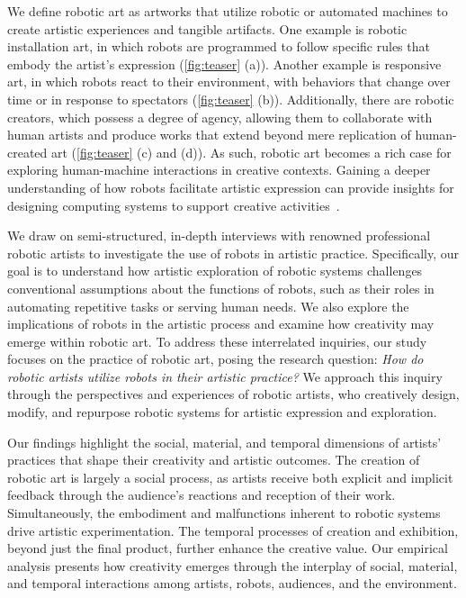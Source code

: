 We define robotic art as artworks that utilize robotic or automated machines to create artistic experiences and tangible artifacts. One example is robotic installation art, in which robots are programmed to follow specific rules that embody the artist’s expression (\autoref{fig:teaser} (a)). Another example is responsive art, in which robots react to their environment, with behaviors that change over time or in response to spectators (\autoref{fig:teaser} (b)). Additionally, there are robotic creators, which possess a degree of agency, allowing them to collaborate with human artists and produce works that extend beyond mere replication of human-created art (\autoref{fig:teaser} (c) and (d)). As such, robotic art becomes a rich case for exploring human-machine interactions in creative contexts. Gaining a deeper understanding of how robots facilitate artistic expression can provide insights for designing computing systems to support creative activities~\cite{gomez2021robot}.

We draw on semi-structured, in-depth interviews with renowned professional robotic artists to investigate the use of robots in artistic practice. Specifically, our goal is to understand how artistic exploration of robotic systems challenges conventional assumptions about the functions of robots, such as their roles in automating repetitive tasks or serving human needs. We also explore the implications of robots in the artistic process and examine how creativity may emerge within robotic art. To address these interrelated inquiries, our study focuses on the practice of robotic art, posing the research question: \textit{How do robotic artists utilize robots in their artistic practice?} We approach this inquiry through the perspectives and experiences of robotic artists, who creatively design, modify, and repurpose robotic systems for artistic expression and exploration.

Our findings highlight the social, material, and temporal dimensions of artists' practices that shape their creativity and artistic outcomes. The creation of robotic art is largely a social process, as artists receive both explicit and implicit feedback through the audience's reactions and reception of their work. Simultaneously, the embodiment and malfunctions inherent to robotic systems drive artistic experimentation. The temporal processes of creation and exhibition, beyond just the final product, further enhance the creative value. Our empirical analysis presents how creativity emerges through the interplay of social, material, and temporal interactions among artists, robots, audiences, and the environment.

